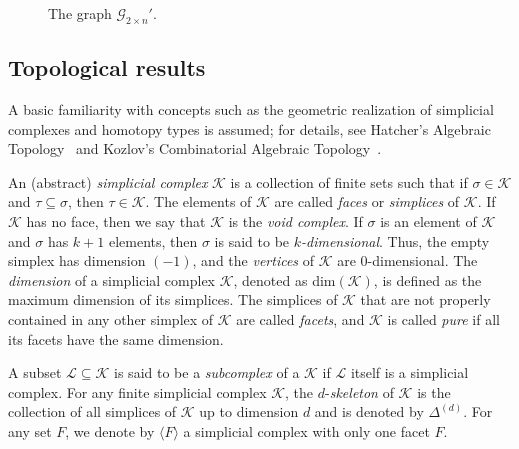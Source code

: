 \documentclass[11pt,reqno,a4paper]{amsart}
\theoremstyle{definition}
\theoremstyle{theorem}
\newcommand{\twoggp}{\mathcal{G}_{2\times n}'}
\newcommand{\lno}{\left(}
\newcommand{\rno}{\right)}
\theoremstyle{remark}
\begin{document}
\begin{figure}[h!]
\begin{minipage}{0.5\textwidth}
        \vspace{-1em}
        \caption{The graph $\twoggp$.}
        \label{fig: graph of G'(2×n)}
    \end{minipage}
\end{figure}

\subsection{Topological results}\label{subsection: 2.2 Topological results} 

A basic familiarity with concepts such as the geometric realization of simplicial complexes and homotopy types is assumed; for details, see Hatcher’s Algebraic Topology~\cite{Hatcherat} and Kozlov’s Combinatorial Algebraic Topology~\cite{kozlovCombAlgTopo}.

An (abstract) \textit{simplicial complex} $\mathcal{K}$ is a collection of finite sets such that if $\sigma \in \mathcal{K}$ and $\tau \subseteq \sigma$, then $\tau \in \mathcal{K}$. 
The elements of $\mathcal{K}$ are called \textit{faces} or \textit{simplices} of $\mathcal{K}$. If $\mathcal{K}$ has no face, then we say that $\mathcal{K}$ is the \textit{void complex}. If $\sigma$ is an element of $\mathcal{K}$ and $\sigma$ has $k+1$ elements, then $\sigma$ is said to be \textit{$k$-dimensional}. Thus, the empty simplex has dimension $\lno-1\rno$, and the \textit{vertices} of $\mathcal{K}$ are $0$-dimensional. The \emph{dimension} of a simplicial complex $\mathcal{K}$, denoted as dim$(\mathcal{K})$, is defined as the maximum dimension of its simplices. The simplices of $\mathcal{K}$ that are not properly contained in any other simplex of $\mathcal{K}$ are called \textit{facets}, and $\mathcal{K}$ is called \textit{pure} if all its facets have the same dimension.

A subset $ \mathcal{L} \subseteq \mathcal{K} $ is said to be a \textit{subcomplex} of a $\mathcal{K}$ if $\mathcal{L}$ itself is a simplicial complex. For any finite simplicial complex $\mathcal{K}$, the $d$-\textit{skeleton} of $\mathcal{K}$ is the collection of all simplices of $\mathcal{K}$ up to dimension $d$ and is denoted by $\Delta^{(d)}$. 
For any set $F$, we denote by $\langle F \rangle$ a simplicial complex with only one facet $F$. 
\end{document}
